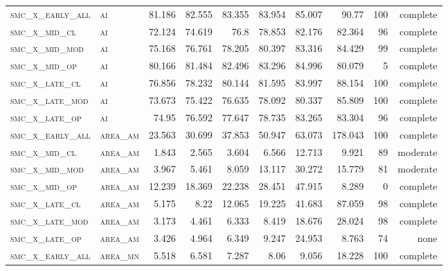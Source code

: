 \begin{landscape}
\begin{center}
\begin{footnotesize}
\begin{longtable}{llrrrrr|rrr}
\textsc{smc\_x\_early\_all} & \textsc{ai        }   & 81.186   & 82.555   & 83.355   & 83.954   & 85.007   & 90.77    & 100 & complete \\
\textsc{smc\_x\_mid\_cl   } & \textsc{ai        }   & 72.124   & 74.619   & 76.8     & 78.853   & 82.176   & 82.364   & 96  & complete \\
\textsc{smc\_x\_mid\_mod  } & \textsc{ai        }   & 75.168   & 76.761   & 78.205   & 80.397   & 83.316   & 84.429   & 99  & complete \\
\textsc{smc\_x\_mid\_op   } & \textsc{ai        }   & 80.166   & 81.484   & 82.496   & 83.296   & 84.996   & 80.079   & 5   & complete \\
\textsc{smc\_x\_late\_cl  } & \textsc{ai        }   & 76.856   & 78.232   & 80.144   & 81.595   & 83.997   & 88.154   & 100 & complete \\
\textsc{smc\_x\_late\_mod } & \textsc{ai        }   & 73.673   & 75.422   & 76.635   & 78.092   & 80.337   & 85.809   & 100 & complete \\
\textsc{smc\_x\_late\_op  } & \textsc{ai        }   & 74.95    & 76.592   & 77.647   & 78.735   & 83.265   & 83.304   & 96  & complete \\
\textsc{smc\_x\_early\_all} & \textsc{area\_am  }   & 23.563   & 30.699   & 37.853   & 50.947   & 63.073   & 178.043  & 100 & complete \\
\textsc{smc\_x\_mid\_cl   } & \textsc{area\_am  }   & 1.843    & 2.565    & 3.604    & 6.566    & 12.713   & 9.921    & 89  & moderate \\
\textsc{smc\_x\_mid\_mod  } & \textsc{area\_am  }   & 3.967    & 5.461    & 8.059    & 13.117   & 30.272   & 15.779   & 81  & moderate \\
\textsc{smc\_x\_mid\_op   } & \textsc{area\_am  }   & 12.239   & 18.369   & 22.238   & 28.451   & 47.915   & 8.289    & 0   & complete \\
\textsc{smc\_x\_late\_cl  } & \textsc{area\_am  }   & 5.175    & 8.22     & 12.065   & 19.225   & 41.683   & 87.059   & 98  & complete \\
\textsc{smc\_x\_late\_mod } & \textsc{area\_am  }   & 3.173    & 4.461    & 6.333    & 8.419    & 18.676   & 28.024   & 98  & complete \\
\textsc{smc\_x\_late\_op  } & \textsc{area\_am  }   & 3.426    & 4.964    & 6.349    & 9.247    & 24.953   & 8.763    & 74  & none     \\
\textsc{smc\_x\_early\_all} & \textsc{area\_mn  }   & 5.518    & 6.581    & 7.287    & 8.06     & 9.056    & 18.228   & 100 & complete \\

\end{longtable}
\end{footnotesize}
\end{center}
\end{landscape}

